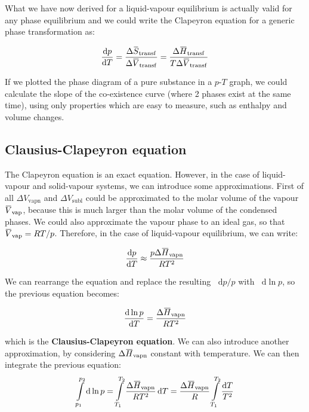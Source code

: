 \documentclass[12pt,a4paper]{report}
\newcommand*\diff{\mathop{}\!\mathrm{d}}
\newcommand{\overbar}[1]{\mkern 1.5mu\overline{\mkern-1.5mu#1\mkern-1.5mu}\mkern 1.5mu}
\newif\ifstudents
\begin{document}
   What we have now derived for a liquid-vapour equilibrium is actually valid for any phase equilibrium and we could write the Clapeyron equation for a generic phase transformation as:
   \ifstudents \hideit[2]{ \fi
   \begin{equation*}
   \frac{\diff p}{\diff T}=\frac{\Delta \overbar{S}_{\mathrm{transf}}}{\Delta \overbar{V}_{\mathrm{transf}}} = \frac{\Delta \overbar{H}_{\mathrm{transf}}}{T \Delta \overbar{V}_{\mathrm{transf}}}
   \end{equation*}
   \ifstudents } \fi
   If we plotted the phase diagram of a pure substance in a $p$-$T$ graph, we could calculate the slope of the co-existence curve (where 2 phases exist at the same time), using only properties which are easy to measure, such as enthalpy and volume changes.
   \subsection*{Clausius-Clapeyron equation}
   The Clapeyron equation is an exact equation. However, in the case of liquid-vapour and solid-vapour systems, we can introduce some approximations. First of all $\Delta V_{\mathrm{vapn}}$ and  $\Delta V_{\mathrm{subl}}$ could be approximated to the molar volume of the vapour $\overbar{V}_{\mathrm{vap}}$, because this is much larger than the molar volume of the condensed phases. We could also approximate the vapour phase to an ideal gas, so that $\overbar{V}_{\mathrm{vap}} = RT/p$. Therefore, in the case of liquid-vapour equilibrium, we can write:
   \ifstudents \hideit[2]{ \fi
   \begin{equation*}
   \frac{\diff p}{\diff T} \approx \frac{p \Delta \overbar{H}_{\mathrm{vapn}}}{RT^{2} }
   \end{equation*}
   \ifstudents } \fi
   We can rearrange the equation and replace the resulting $\diff p/p$ with $\diff \ln p$, so the previous equation becomes:
   \ifstudents \hideit[2]{ \fi
   \begin{equation*}
   \frac{\diff \ln p}{\diff T} = \frac{\Delta \overbar{H}_{\mathrm{vapn}}}{RT^{2} }
   \end{equation*}
   \ifstudents } \fi
   which is the \textbf{Clausius-Clapeyron equation}.
   We can also introduce another approximation, by considering $\Delta \overbar{H}_{\mathrm{vapn}}$ constant with temperature. We can then integrate the previous equation:
   \begin{equation*}
   \int \limits_{p_{1}}^{p_{2}} \diff \ln p = \int \limits_{T_{1}}^{T_{2}} \frac{\Delta \overbar{H}_{\mathrm{vapn}}}{RT^{2} } \diff T = \frac{\Delta \overbar{H}_{\mathrm{vapn}}}{R}\int \limits_{T_{1}}^{T_{2}} \frac{\diff T}{T^{2}}
   \end{equation*}
\end{document}
